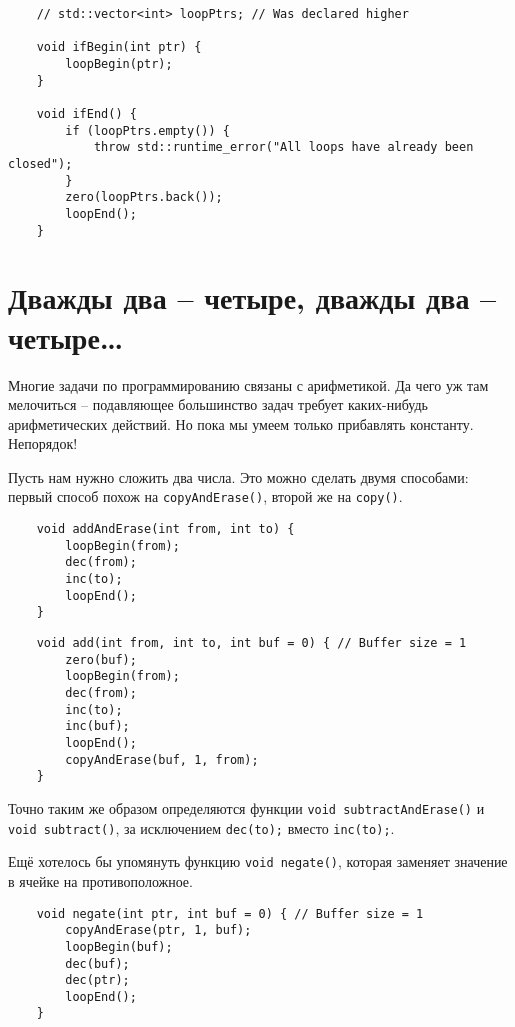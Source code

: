 \documentclass{book}
\begin{document}
\begin{verbatim}
    // std::vector<int> loopPtrs; // Was declared higher
    
    void ifBegin(int ptr) {
        loopBegin(ptr);
    }

    void ifEnd() {
        if (loopPtrs.empty()) {
            throw std::runtime_error("All loops have already been closed");
        }
        zero(loopPtrs.back());
        loopEnd();
    }
\end{verbatim}

\section{Дважды два -- четыре, дважды два -- четыре\dots}
Многие задачи по программированию связаны с арифметикой. Да чего уж там мелочиться -- подавляющее большинство
задач требует каких-нибудь арифметических действий. Но пока мы умеем только прибавлять константу. Непорядок!

Пусть нам нужно сложить два числа. Это можно сделать двумя способами: первый способ похож на \texttt{copyAndErase()},
второй же на \texttt{copy()}. 

\begin{verbatim}
    void addAndErase(int from, int to) {
        loopBegin(from);
        dec(from);
        inc(to);
        loopEnd();
    }
\end{verbatim}

\begin{verbatim}
    void add(int from, int to, int buf = 0) { // Buffer size = 1
        zero(buf);
        loopBegin(from);
        dec(from);
        inc(to);
        inc(buf);
        loopEnd();
        copyAndErase(buf, 1, from);
    }
\end{verbatim}

Точно таким же образом определяются функции \texttt{void subtractAndErase()} и \texttt{void subtract()}, за исключением
\texttt{dec(to);} вместо \texttt{inc(to);}.

Ещё хотелось бы упомянуть функцию \texttt{void negate()}, которая заменяет значение в ячейке на противоположное.

\begin{verbatim}
    void negate(int ptr, int buf = 0) { // Buffer size = 1
        copyAndErase(ptr, 1, buf);
        loopBegin(buf);
        dec(buf);
        dec(ptr);
        loopEnd();
    }
\end{verbatim}
\end{document}
